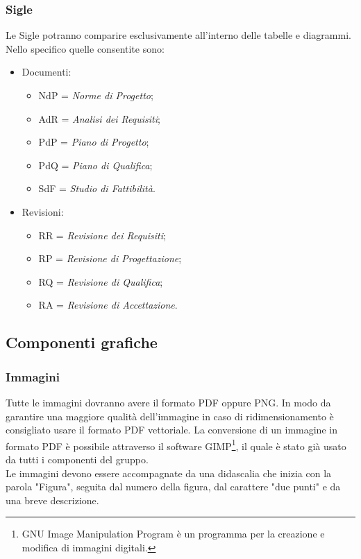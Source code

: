 \subsubsection{Sigle}
Le Sigle potranno comparire esclusivamente all'interno delle tabelle e diagrammi. Nello specifico quelle consentite sono: 
\begin{itemize}
	\item Documenti:
	\begin{itemize}
		\item NdP = \textit{Norme di Progetto};
		\item AdR = \textit{Analisi dei Requisiti};
		\item PdP = \textit{Piano di Progetto};
		\item PdQ = \textit{Piano di Qualifica};
		\item SdF = \textit{Studio di Fattibilità}.
	\end{itemize}
	\item Revisioni:
	\begin{itemize}
		\item RR = \textit{Revisione dei Requisiti};
		\item RP = \textit{Revisione di Progettazione};
		\item RQ = \textit{Revisione di Qualifica};
		\item RA = \textit{Revisione di Accettazione}.
	\end{itemize}
\end{itemize}

\subsection{Componenti grafiche}
\subsubsection{Immagini}
Tutte le immagini dovranno avere il formato \gls{PDF} oppure PNG. In modo da garantire una maggiore qualità dell'immagine in caso di ridimensionamento è consigliato usare il formato \gls{PDF} vettoriale. La conversione di un immagine in formato \gls{PDF} è possibile attraverso il software GIMP\footnote{GNU Image Manipulation Program è un programma per la creazione e modifica di immagini digitali.}, il quale è stato già usato da tutti  i componenti del gruppo. \\ Le immagini devono essere accompagnate da una didascalia che inizia con la parola "Figura", seguita dal numero della figura, dal carattere "due punti" e da una breve descrizione.

